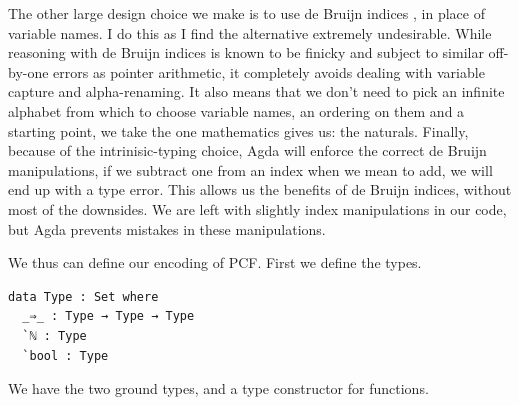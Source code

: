 \documentclass[12pt,a4paper,twoside,openright]{report}
\begin{document}
The other large design choice we make is to use de Bruijn indices \cite{de-Bruijn}, in place of variable names. I do this as I find the alternative extremely undesirable. While reasoning with de Bruijn indices is known to be finicky and subject to similar off-by-one errors as pointer arithmetic, it completely avoids dealing with variable capture and alpha-renaming. It also means that we don't need to pick an infinite alphabet from which to choose variable names, an ordering on them and a starting point, we take the one mathematics gives us: the naturals. Finally, because of the intrinisic-typing choice, Agda will enforce the correct de Bruijn manipulations, if we subtract one from an index when we mean to add, we will end up with a type error. This allows us the benefits of de Bruijn indices, without most of the downsides. We are left with slightly index manipulations in our code, but Agda prevents mistakes in these manipulations.

We thus can define our encoding of PCF. First we define the types.
\begin{verbatim}
data Type : Set where
  _⇒_ : Type → Type → Type
  `ℕ : Type
  `bool : Type
\end{verbatim}
We have the two ground types, and a type constructor for functions. 
\end{document}

